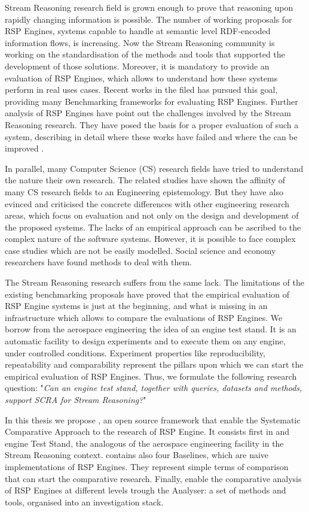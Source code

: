 Stream Reasoning research field is grown enough to prove that reasoning upon rapidly changing information is possible. The number of working proposals for RSP Engines, systems capable to handle at semantic level RDF-encoded information flows, is increasing. Now the Stream Reasoning community is working on the standardisation of the methods and tools that supported the development of those solutions. Moreover, it is mandatory to provide an evaluation of RSP Engines, which allows to understand how these systems perform in real uses cases. 
Recent works in the filed \cite{Zhang2012, LePhuoc2012c, DBLP:conf/semweb/DellAglioCBCV13} has pursued this goal, providing many Benchmarking frameworks for evaluating RSP Engines. Further analysis of RSP Engines have point out the challenges involved by the Stream Reasoning research. They have posed the basis for a proper evaluation of such a system, describing in detail where these works have failed and where the can be improved \cite{DBLP:conf/esws/ScharrenbachUMVB13}. 

In parallel, many  Computer Science (CS) research fields have tried to understand the nature their own research. The related studies \cite{Tichy:1995:EEC:209090.209093, Wainer:2009:EEC:1518331.1518552} have shown the affinity of many CS research fields to an Engineering epistemology. But they have also evinced and criticised the concrete differences with other engineering research areas, which focus on evaluation and not only on the design and development of the proposed systems. The lacks of an empirical approach can be ascribed to the complex nature of the software systems. However, it is possible to face complex case studies which are not be easily modelled. Social science and economy researchers have found methods to deal with them.

The Stream Reasoning research suffers from the same lack. The limitations of the existing benchmarking proposals have proved that the empirical evaluation of RSP Engine systems is just at the beginning, and what is missing in an infrastructure which allows to compare the evaluations of RSP Engines. We borrow from the aerospace engineering the idea of an engine test stand. It is an automatic facility to design experiments and to execute them on any engine, under controlled conditions. Experiment properties like reproducibility, repeatability and comparability represent the pillars upon which we can start the empirical evaluation of RSP Engines. Thus, we formulate the following research question: "\textit{Can an engine test stand, together with queries, datasets and methods, support SCRA for Stream Reasoning?}"

In this thesis we propose \namens, an open source framework that enable the  Systematic Comparative Approach to the research of RSP Engine. It consists first in and engine Test Stand, the analogous of the aerospace engineering facility in the Stream Reasoning context. \name contains also four Baselines, which are naive implementations of RSP Engines. They represent  simple terms of comparison that can start the comparative research. Finally, \name enable the comparative analysis of RSP Engines at different levels trough the Analyser: a set of methods and tools, organised into an investigation stack.
